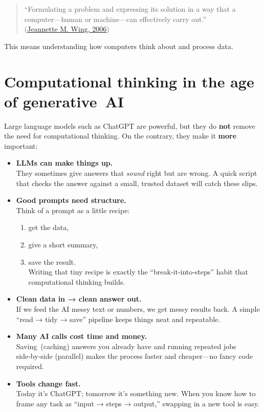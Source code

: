 \documentclass[
]{book}
\providecommand{\tightlist}{%
  \setlength{\itemsep}{0pt}\setlength{\parskip}{0pt}}
\begin{document}
\begin{quote}
``Formulating a problem and expressing its solution in a way that a computer---human or machine---can effectively carry out.''\\
(\href{http://www.cs.cmu.edu/afs/cs/usr/wing/www/publications/Wing06.pdf}{Jeannette M. Wing, 2006})
\end{quote}

This means understanding how computers think about and process data.

\section{Computational thinking in the age of generative~AI}\label{computational-thinking-in-the-age-of-generative-ai}

Large language models such as ChatGPT are powerful, but they do \textbf{not} remove the need for computational thinking. On the contrary, they make it \textbf{more} important:

\begin{itemize}
\item
  \textbf{LLMs can make things up.}\\
  They sometimes give answers that \emph{sound} right but are wrong. A quick script that checks the answer against a small, trusted dataset will catch these slips.
\item
  \textbf{Good prompts need structure.}\\
  Think of a prompt as a little recipe:

  \begin{enumerate}
  \def\labelenumi{\arabic{enumi}.}
  \tightlist
  \item
    get the data,\\
  \item
    give a short summary,\\
  \item
    save the result.\\
    Writing that tiny recipe is exactly the ``break‑it‑into‑steps'' habit that computational thinking builds.
  \end{enumerate}
\item
  \textbf{Clean data in → clean answer out.}\\
  If we feed the AI messy text or numbers, we get messy results back. A simple ``read → tidy → save'' pipeline keeps things neat and repeatable.
\item
  \textbf{Many AI calls cost time and money.}\\
  Saving~(caching) answers you already have and running repeated jobs side‑by‑side (parallel) makes the process faster and cheaper---no fancy code required.
\item
  \textbf{Tools change fast.}\\
  Today it's ChatGPT; tomorrow it's something new. When you know how to frame any task as ``input → steps → output,'' swapping in a new tool is easy.
\end{itemize}
\end{document}
